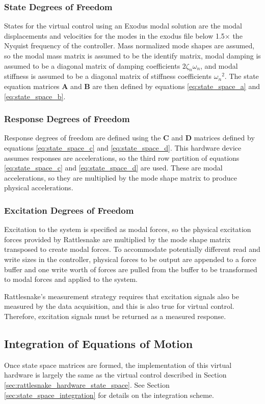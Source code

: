\documentclass[pdf,12pt,report]{SANDreport}
\begin{document}
    \subsubsection{State Degrees of Freedom}
    States for the virtual control using an Exodus modal solution are the modal displacements and velocities for the modes in the exodus file below 1.5$\times$ the Nyquist frequency of the controller.  Mass normalized mode shapes are assumed, so the modal mass matrix is assumed to be the identify matrix, modal damping is assumed to be a diagonal matrix of damping coefficients $2\zeta_n\omega_n$, and modal stiffness is assumed to be a diagonal matrix of stiffness coefficients ${\omega_n}^2$.  The state equation matrices $\mathbf{A}$ and $\mathbf{B}$ are then defined by equations \eqref{eq:state_space_a} and \eqref{eq:state_space_b}.
    
    \subsubsection{Response Degrees of Freedom}
    Response degrees of freedom are defined using the $\mathbf{C}$ and $\mathbf{D}$ matrices defined by equations \eqref{eq:state_space_c} and \eqref{eq:state_space_d}.  This hardware device assumes responses are accelerations, so the third row partition of equations \eqref{eq:state_space_c} and \eqref{eq:state_space_d} are used.  These are modal accelerations, so they are multiplied by the mode shape matrix to produce physical accelerations.
    
    \subsubsection{Excitation Degrees of Freedom}
    Excitation to the system is specified as modal forces, so the physical excitation forces provided by Rattlesnake are multiplied by the mode shape matrix transposed to create modal forces.  To accommodate potentially different read and write sizes in the controller, physical forces to be output are appended to a force buffer and one write worth of forces are pulled from the buffer to be transformed to modal forces and applied to the system.
    
    Rattlesnake's measurement strategy requires that excitation signals also be measured by the data acquisition, and this is also true for virtual control.  Therefore, excitation signals must be returned as a measured response.
    
    \subsection{Integration of Equations of Motion}
    Once state space matrices are formed, the implementation of this virtual hardware is largely the same as the virtual control described in Section \ref{sec:rattlesnake_hardware_state_space}.  See Section \ref{sec:state_space_integration} for details on the integration scheme.
    
\end{document}
